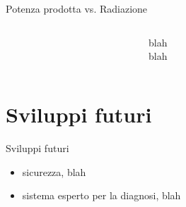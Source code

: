 \documentclass{beamer}
\begin{document}
%
\begin{frame}{Potenza prodotta vs. Radiazione}
  \begin{columns}
    \column{2.5in}
    \begin{figure}[!h]
      \begin{center}
      \end{center}
    \end{figure}
    \begin{figure}[!h]
      \begin{center}
      \end{center}
    \end{figure}
    \column{1.5in}
    blah \\
    blah
    \end{columns}
\end{frame}
%

%
\section{Sviluppi futuri}
%
\begin{frame}{Sviluppi futuri}
  \begin{itemize}
    \item sicurezza, blah
    \item sistema esperto per la diagnosi, blah
  \end{itemize}
   \begin{figure}[!h]
      \begin{center}
      \end{center}
    \end{figure}
\end{frame}
%
\end{document}
